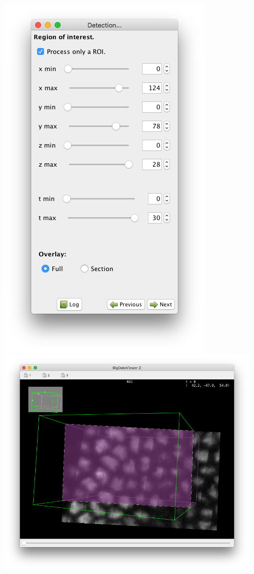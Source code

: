 \begin{center}
         \includegraphics[height=0.25\textheight]{figures/Mastodon_ROIpanel.png}
         \includegraphics[height=0.25\textheight]{figures/Mastodon_ROIBDV.png}
\end{center}

